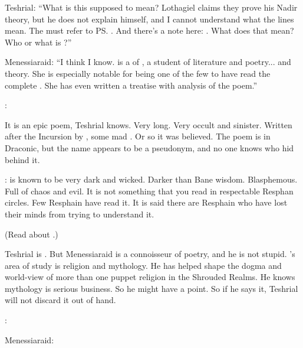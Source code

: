 Teshrial:
``What is this supposed to mean?
  Lothagiel claims they prove his Nadir theory, but he does not explain himself, and I cannot understand what the lines mean. 
  The  must refer to \ps{\Ishnaruchaefir} \vertex. 
  And there's a note here: 
  .
  What does that mean? 
  Who or what is \Urizeth?''

Menessiaraid:
``I think I know. \Urizeth is a \thelyad \resvil of \TiphredSerah, a student of literature and poetry... and \matrix theory.  
  She is especially notable for being one of the few \resphain to have read the complete \WanderersInDarknessEmph.
  She has even written a treatise with analysis of the poem.''

\Teshrial:

It is an epic poem, Teshrial knows. 
Very long. 
Very occult and sinister. 
Written after the Incursion by \Melcryth, some mad \dragon.
Or so it was believed.
The poem is in Draconic, but the name \quo{\Melcryth} appears to be a pseudonym, and no one knows who hid behind it. 

\Menessiaraid:
\WanderersInDarknessEmph is known to be very dark and wicked. 
Darker than Bane wisdom. 
Blasphemous. 
Full of chaos and evil. 
It is not something that you read in respectable Resphan circles. 
Few Resphain have read it. 
It is said there are Resphain who have lost their minds from trying to understand it. 

(Read about .)

Teshrial is \skeptical. 
But Menessiaraid is a connoisseur of poetry, and he is not stupid. 
\Menessiaraid{}'s area of study is religion and mythology.
He has helped shape the dogma and world-view of more than one puppet religion in the Shrouded Realms.
He knows mythology is serious business.
So he might have a point.
So if he says it, Teshrial will not discard it out of hand.

\Teshrial: 
  
Menessiaraid:

